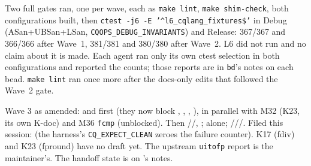 Two full gates ran, one per wave, each as \texttt{make lint}, \texttt{make shim-check}, both
configurations built, then \texttt{ctest -j6 -E '\^{}l6\_cqlang\_fixtures\$'} in Debug (ASan+UBSan+LSan,
\texttt{CQOPS\_DEBUG\_INVARIANTS}) and Release: 367/367 and 366/366 after Wave~1, 381/381 and 380/380
after Wave~2. L6 did not run and no claim about it is made. Each agent ran only its own ctest
selection in both configurations and reported the counts; those reports are in \texttt{bd}'s notes on
each bead. \texttt{make lint} ran once more after the docs-only edits that followed the Wave~2 gate.

Wave 3 as amended:  and  first (they now block ,
, , ), in parallel with  M32 (K23, its own K-doc)
and  M36 \texttt{fcmp} (unblocked). Then //,
;  alone; ///. Filed
this session:  (the harness's \texttt{CQ\_EXPECT\_CLEAN} zeroes the failure counter).
K17 (fdiv) and K23 (fpround) have no draft yet. The upstream \texttt{uitofp} report is the
maintainer's. The handoff state is on 's notes.

